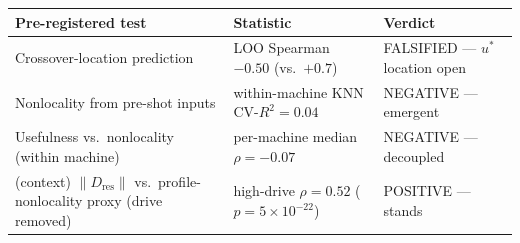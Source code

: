 \begin{tabularx}{\textwidth}{@{}>{\raggedright\arraybackslash}X l >{\raggedright\arraybackslash}p{3.8cm}@{}}
\toprule
Pre-registered test & Statistic & Verdict \\
\midrule
Crossover-location prediction & LOO Spearman $-0.50$ (vs.\ $+0.7$) & FALSIFIED --- $u^\ast$ location open \\
Nonlocality from pre-shot inputs & within-machine KNN CV-$R^2 = 0.04$ & NEGATIVE --- emergent \\
Usefulness vs.\ nonlocality (within machine) & per-machine median $\rho = -0.07$ & NEGATIVE --- decoupled \\
(context) $\lVert D_{\mathrm{res}}\rVert$ vs.\ profile-nonlocality proxy (drive removed) & high-drive $\rho = 0.52$ ($p = 5\times10^{-22}$) & POSITIVE --- stands \\
\bottomrule
\end{tabularx}
